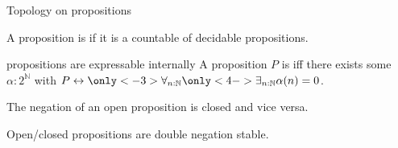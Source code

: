 \documentclass{beamer}
\begin{document}
\begin{frame}{Topology on propositions}
  \begin{definition}
  A proposition is  if it is a countable 
   of decidable propositions. 
\end{definition}
\pause 
\begin{block}{
   
  propositions are expressable internally}
  A proposition $P$ is 
  iff \pause there exists some $\alpha:2^\mathbb N$ with 
  $P\leftrightarrow \only<-3>{\forall_{n:\mathbb N}}\only<4->{{\exists}_{n:\mathbb N}}\alpha(n) = 0$.
\end{block}
\pause
\pause
\begin{corollary}
  The negation of an open proposition is closed 
  and vice versa. 
\end{corollary}
\pause 
\begin{corollary}
  Open/closed propositions are double negation stable. 
\end{corollary}
\end{frame}
\end{document}
